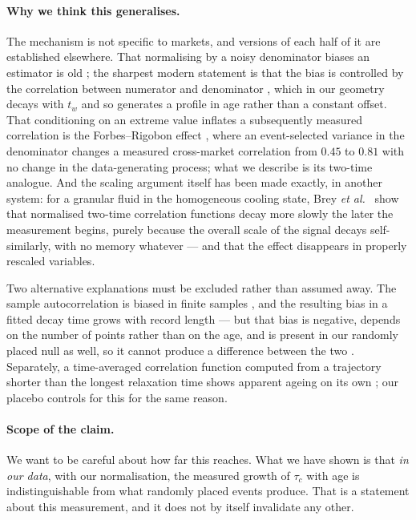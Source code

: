 \documentclass[aps,pre,twocolumn,superscriptaddress,floatfix,nofootinbib]{revtex4-2}
\begin{document}
\paragraph*{Why we think this generalises.}
The mechanism is not specific to markets, and versions of each half of it are
established elsewhere. That normalising by a noisy denominator biases an
estimator is old \cite{pearson1897,kronmal1993}; the sharpest modern statement
is that the bias is controlled by the correlation between numerator and
denominator \cite{ciuparu2016}, which in our geometry decays with $t_w$ and so
generates a profile in age rather than a constant offset. That conditioning on
an extreme value inflates a subsequently measured correlation is the
Forbes--Rigobon effect \cite{forbes2002,boyer1999}, where an event-selected
variance in the denominator changes a measured cross-market correlation from
$0.45$ to $0.81$ with no change in the data-generating process; what we
describe is its two-time analogue. And the scaling argument itself has been
made exactly, in another system: for a granular fluid in the homogeneous
cooling state, Brey \textit{et al.}\ \cite{brey2007} show that normalised
two-time correlation functions decay more slowly the later the measurement
begins, purely because the overall scale of the signal decays self-similarly,
with no memory whatever --- and that the effect disappears in properly
rescaled variables.

Two alternative explanations must be excluded rather than assumed away. The
sample autocorrelation is biased in finite samples \cite{kendall1954}, and the
resulting bias in a fitted decay time grows with record length --- but that
bias is negative, depends on the number of points rather than on the age, and
is present in our randomly placed null as well, so it cannot produce a
difference between the two \cite{zeraati2022}. Separately, a time-averaged
correlation function computed from a trajectory shorter than the longest
relaxation time shows apparent ageing on its own \cite{akimoto2023}; our
placebo controls for this for the same reason.

\paragraph*{Scope of the claim.}
We want to be careful about how far this reaches. What we have shown is that
\emph{in our data}, with our normalisation, the measured growth of $\tau_c$
with age is indistinguishable from what randomly placed events produce. That
is a statement about this measurement, and it does not by itself invalidate
any other.
\end{document}
